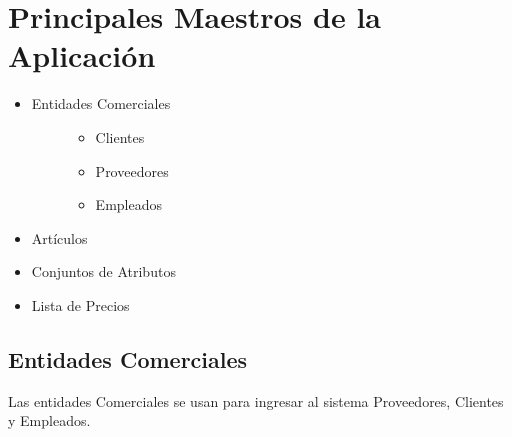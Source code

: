 \documentclass[letterpaper,10pt,spanish]{sphinxmanual}
\begin{document}
\chapter{Principales Maestros de la Aplicación}
\label{maestros:principales-maestros-de-la-aplicacion}\label{maestros::doc}\begin{itemize}
\item {} \begin{description}
\item[{Entidades Comerciales}] \leavevmode\begin{itemize}
\item {} 
Clientes

\item {} 
Proveedores

\item {} 
Empleados

\end{itemize}

\end{description}

\item {} 
Artículos

\item {} 
Conjuntos de Atributos

\item {} 
Lista de Precios

\end{itemize}


\section{Entidades Comerciales}
\label{maestros:entidades-comerciales}
Las entidades Comerciales se usan para ingresar al sistema Proveedores, Clientes y Empleados.
\end{document}
